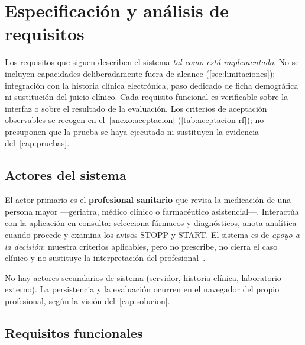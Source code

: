 
\chapter{Especificación y análisis de requisitos}
\label{cap:requisitos}

Los requisitos que siguen describen el sistema \emph{tal como está implementado}.
No se incluyen capacidades deliberadamente fuera de alcance
(\cref{sec:limitaciones}): integración con la historia clínica electrónica,
paso dedicado de ficha demográfica ni sustitución del juicio clínico. Cada
requisito funcional es verificable sobre la interfaz o sobre el resultado de
la evaluación. Los criterios de aceptación observables se recogen en
el~\cref{anexo:aceptacion} (\cref{tab:aceptacion-rf}); no presuponen que la
prueba se haya ejecutado ni sustituyen la evidencia del~\cref{cap:pruebas}.

\section{Actores del sistema}
\label{sec:actores}

El actor primario es el \textbf{profesional sanitario} que revisa la
medicación de una persona mayor ---geriatra, médico clínico o farmacéutico
asistencial---. Interactúa con la aplicación en consulta: selecciona fármacos
y diagnósticos, anota analítica cuando procede y examina los avisos STOPP y
START. El sistema es de \emph{apoyo a la decisión}: muestra criterios
aplicables, pero no prescribe, no cierra el caso clínico y no sustituye la
interpretación del profesional~\cite{omahony2023stopp}.

No hay actores secundarios de sistema (servidor, historia clínica, laboratorio
externo). La persistencia y la evaluación ocurren en el navegador del propio
profesional, según la visión del~\cref{cap:solucion}.

\section{Requisitos funcionales}
\label{sec:rf}

